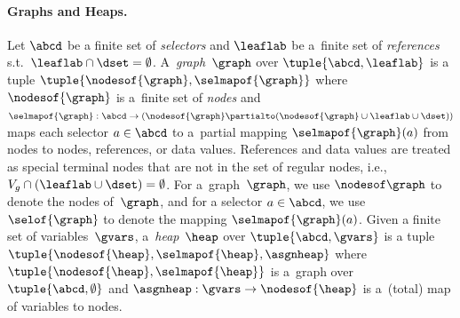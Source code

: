 {%
\paragraph{Graphs and Heaps.}

Let $\abcd$ be a finite set of \emph{selectors} and $\leaflab$ be a~finite set
of \emph{references} s.t.~$\leaflab \cap \dset = \emptyset$.
A~\emph{graph}~$\graph$ over $\tuple{\abcd,\leaflab}$ is
a tuple $\tuple{\nodesof{\graph},\selmapof{\graph}}$ where
$\nodesof{\graph}$ is a~finite set  of \emph{nodes} and $\selmapof{\graph}: \abcd \to (\nodesof{\graph}
\partialto (\nodesof{\graph}\cup \leaflab \cup \dset))$ maps each selector $a \in \abcd$
to a~partial mapping $\selmapof{\graph}(a)$ from nodes to nodes, references, or
data values.
%
References and data values are treated as special terminal
nodes that are not in the set of regular nodes, i.e., $V_g \cap (\leaflab \cup
\dset) = \emptyset$.
%
For a~graph~$\graph$, we use $\nodesof \graph$ to denote the nodes of~$\graph$,
and for a selector $a \in \abcd$, we
use $\selof{\graph}$ to denote the mapping $\selmapof{\graph}(a)$.
Given a finite set of variables~$\gvars$,
a~\emph{heap}~$\heap$ over $\tuple{\abcd, \gvars}$ is
a tuple $\tuple{\nodesof{\heap},\selmapof{\heap}, \asgnheap}$ where
$\tuple{\nodesof{\heap}, \selmapof{\heap}}$ is a~graph over $\tuple{\abcd,
\emptyset}$ and $\asgnheap: \gvars \to \nodesof{\heap}$ is a~(total)
map of variables to nodes.



}
